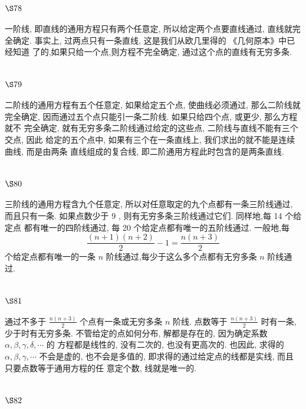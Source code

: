 \section{$\S 78$}

一阶线, 即直线的通用方程只有两个任意定, 所以给定两个点要直线通过, 直线就完 全确定. 事实上, 过两点只有一条直线, 这是我们从欧几里得的 《几何原本》中已经知道 了的,如果只给一个点,则方程不完全确定, 通过这个点的直线有无穷多条.

\section{$\S 79$}

二阶线的通用方程有五个任意定, 如果给定五个点, 使曲线必须通过, 那么二阶线就 完全确定, 因而通过五个点只能引一条二阶线. 如果只给四个点, 或更少, 那么方程就不 完全确定, 就有无穷多条二阶线通过给定的这些点, 二阶线与直线不能有三个交点, 因此 给定的五个点中, 如果有三个在一条直线上, 我们求出的就不能是连续曲线, 而是由两条 直线组成的复合线, 即二阶通用方程此时包含的是两条直线.

\section{$\S 80$}

三阶线的通用方程含九个任意定, 所以对任意取定的九个点都有一条三阶线通过, 而且只有一条. 如果点数少于 9 , 则有无穷多条三阶线通过它们. 同样地,每 14 个给定点 都有唯一的四阶线通过, 每 20 个给定点都有唯一的五阶线通过. 一般地,每
\[
\frac{(n+1)(n+2)}{2}-1=\frac{n(n+3)}{2}
\]
个给定点都有唯一的一条 $n$ 阶线通过,每少于这么多个点都有无穷多条 $n$ 阶线通过.

\section{$\S 81$}

通过不多于 $\frac{n(n+3)}{2}$ 个点有一条或无穷多条 $n$ 阶线. 点数等于 $\frac{n(n+3)}{2}$ 时有一条, 少于时有无穷多条. 不管给定的点如何分布, 解都是存在的, 因为确定系数 $\alpha, \beta, \gamma, \delta, \cdots$ 的 方程都是线性的, 没有二次的, 也没有更高次的. 也因此, 求得的 $\alpha, \beta, \gamma, \cdots$ 不会是虚的, 也不会是多值的, 即求得的通过给定点的线都是实线, 而且只要点数等于通用方程的任 意定个数, 线就是唯一的.

\section{$\S 82$}

